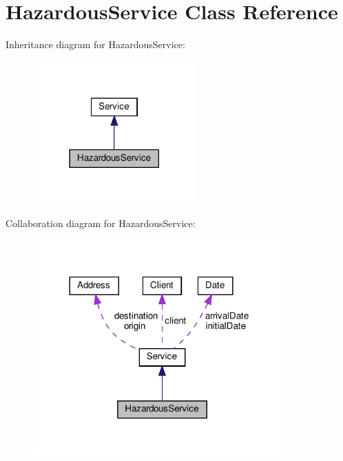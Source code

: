 \hypertarget{class_hazardous_service}{}\section{Hazardous\+Service Class Reference}
\label{class_hazardous_service}


Inheritance diagram for Hazardous\+Service\+:\nopagebreak
\begin{figure}[H]
\begin{center}
\leavevmode
\includegraphics[width=177pt]{class_hazardous_service__inherit__graph}
\end{center}
\end{figure}


Collaboration diagram for Hazardous\+Service\+:
\nopagebreak
\begin{figure}[H]
\begin{center}
\leavevmode
\includegraphics[width=276pt]{class_hazardous_service__coll__graph}
\end{center}
\end{figure}
